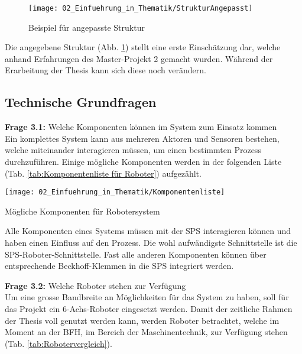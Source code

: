 		\begin{figure}[h!]
			\centering
			\texttt{[image: 02\_Einfuehrung\_in\_Thematik/StrukturAngepasst]}
			\captionsetup{justification=centering}
			\caption{Beispiel für angepasste Struktur}
			\label{fig:StrukturAngepasst}
		\end{figure}
		
		Die angegebene Struktur (Abb. \ref{fig:StrukturAngepasst}) stellt eine erste Einschätzung dar, welche anhand Erfahrungen des Master-Projekt 2 gemacht wurden. Während der Erarbeitung der Thesis kann sich diese noch verändern. 
	
	\newpage
	
	\subsection{Technische Grundfragen} \label{Technische Grundfragen}
	
	\textbf{Frage 3.1:} Welche Komponenten können im System zum Einsatz kommen \vspace{2mm} 
	\\
		Ein komplettes System kann aus mehreren Aktoren und Sensoren bestehen, welche miteinander interagieren müssen, um einen bestimmten Prozess durchzuführen. Einige mögliche Komponenten werden in der folgenden Liste (Tab. \ref{tab:Komponentenliste für Roboter}) aufgezählt.
		
		\begin{table}[h!]
			\centering
			\texttt{[image: 02\_Einfuehrung\_in\_Thematik/Komponentenliste]}
			\captionsetup{justification=centering}
			\caption{Mögliche Komponenten für Robotersystem}
			\label{tab:Komponentenliste für Roboter}
		\end{table}
		
		Alle Komponenten eines Systems müssen mit der \Gls{SPS} interagieren können und haben einen Einfluss auf den Prozess. Die wohl aufwändigste Schnittstelle ist die \Gls{SPS}-Roboter-Schnittstelle. Fast alle anderen Komponenten können über entsprechende Beckhoff-Klemmen in die \Gls{SPS} integriert werden.
	
	\vspace{3mm}
	
	\textbf{Frage 3.2:} Welche Roboter stehen zur Verfügung \vspace{2mm} 
	\\
		Um eine grosse Bandbreite an Möglichkeiten für das System zu haben, soll für das Projekt ein 6-Achs-Roboter eingesetzt werden. Damit der zeitliche Rahmen der Thesis voll genutzt werden kann, werden Roboter betrachtet, welche im Moment an der BFH, im Bereich der Maschinentechnik, zur Verfügung stehen (Tab. \ref{tab:Robotervergleich}). 
		

